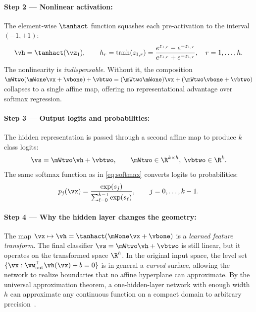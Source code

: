\documentclass[sigconf,screen,nonacm]{acmart}
\begin{document}
\paragraph{Step 2 --- Nonlinear activation:}
The element-wise $\tanhact$ function squashes each pre-activation to the interval $(-1, +1)$:
\begin{equation}
    \vh = \tanhact(\vz_1),
    \qquad h_r = \tanh(z_{1,r}) = \frac{e^{z_{1,r}} - e^{-z_{1,r}}}{e^{z_{1,r}} + e^{-z_{1,r}}}, \quad r=1,\ldots,h.
    \label{eq:tanh}
\end{equation}
The nonlinearity is \emph{indispensable}. Without it, the composition $\mWtwo(\mWone \vx + \vbone) + \vbtwo = (\mWtwo\mWone)\vx + (\mWtwo\vbone + \vbtwo)$ collapses to a single affine map, offering no representational advantage over softmax regression.

\paragraph{Step 3 --- Output logits and probabilities:}
The hidden representation is passed through a second affine map to produce $k$ class logits:
\begin{equation}
    \vs = \mWtwo \vh + \vbtwo, \qquad \mWtwo \in \R^{k \times h},\; \vbtwo \in \R^k.
    \label{eq:output-logits}
\end{equation}
The same softmax function as in \cref{eq:softmax} converts logits to probabilities:
\begin{equation}
    p_j(\vx) = \frac{\exp(s_j)}{\sum_{\ell=0}^{k-1}\exp(s_\ell)}, \qquad j = 0,\ldots, k-1.
    \label{eq:nn-softmax}
\end{equation}

\paragraph{Step 4 --- Why the hidden layer changes the geometry:}
The map $\vx \mapsto \vh = \tanhact(\mWone \vx + \vbone)$ is a \emph{learned feature transform}. The final classifier $\vs = \mWtwo \vh + \vbtwo$ is still linear, but it operates on the transformed space $\R^h$. In the original input space, the level set $\{\vx : \vw^\top_{\text{out}}\vh(\vx) + b = 0\}$ is in general a \emph{curved} surface, allowing the network to realize boundaries that no affine hyperplane can approximate. By the universal approximation theorem, a one-hidden-layer network with enough width $h$ can approximate any continuous function on a compact domain to arbitrary precision~\cite{goodfellow2016deep}.
\end{document}

